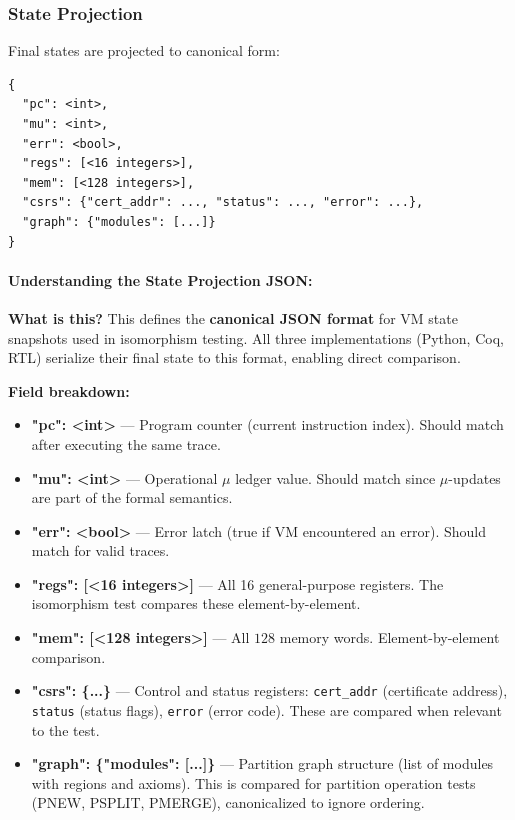 \subsubsection{State Projection}

Final states are projected to canonical form:
\begin{lstlisting}
{
  "pc": <int>,
  "mu": <int>,
  "err": <bool>,
  "regs": [<16 integers>],
  "mem": [<128 integers>],
  "csrs": {"cert_addr": ..., "status": ..., "error": ...},
  "graph": {"modules": [...]}
}
\end{lstlisting}

\paragraph{Understanding the State Projection JSON:}

\textbf{What is this?} This defines the \textbf{canonical JSON format} for VM state snapshots used in isomorphism testing. All three implementations (Python, Coq, RTL) serialize their final state to this format, enabling direct comparison.

\textbf{Field breakdown:}
\begin{itemize}
    \item \textbf{"pc": <int>} — Program counter (current instruction index). Should match after executing the same trace.
    \item \textbf{"mu": <int>} — Operational $\mu$ ledger value. Should match since $\mu$-updates are part of the formal semantics.
    \item \textbf{"err": <bool>} — Error latch (true if VM encountered an error). Should match for valid traces.
    \item \textbf{"regs": [<16 integers>]} — All 16 general-purpose registers. The isomorphism test compares these element-by-element.
    \item \textbf{"mem": [<128 integers>]} --- All $128$ memory words. Element-by-element comparison.
    \item \textbf{"csrs": \{...\}} — Control and status registers: \texttt{cert\_addr} (certificate address), \texttt{status} (status flags), \texttt{error} (error code). These are compared when relevant to the test.
    \item \textbf{"graph": \{"modules": [...]\}} — Partition graph structure (list of modules with regions and axioms). This is compared for partition operation tests (PNEW, PSPLIT, PMERGE), canonicalized to ignore ordering.
\end{itemize}

